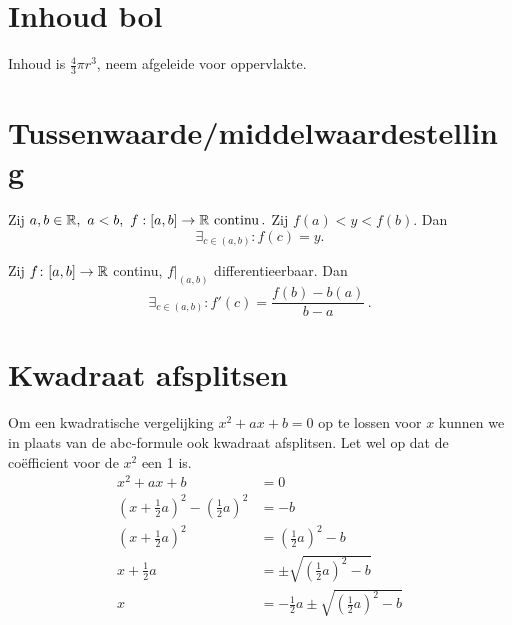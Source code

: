 \documentclass{article}
\begin{document}
	\section{Inhoud bol}\label{sec:inhoudBol}
		Inhoud is $\frac{4}{3} \pi r^3$, neem afgeleide voor oppervlakte.

    \section{Tussenwaarde/middelwaardestelling}\label{sec:tussenwaarde/middelwaardestelling}
    \begin{stelling}

        Zij $a,b \in \mathbb{R},\ a<b,\
            f:[a,b]\to \mathbb{R} \text{ continu}\,.
        $
        Zij $f(a)<y<f(b)$.
        Dan \[ \exists_{c\in(a,b)}:f(c)=y. \]
    \end{stelling}

    \begin{stelling}

        Zij $f\colon[a,b] \to \mathbb{R}$ continu, $f|_{(a,b)}$ differentieerbaar.
        Dan
        \[
        \exists_{c \in (a,b)} : f'(c) = \frac{f(b)-b(a)}{b-a}\,.
        \]
    \end{stelling}
		
	\section{Kwadraat afsplitsen}\label{sec:kwadraatAfsplitsen}
        Om een kwadratische vergelijking $x^2 + ax + b = 0$ op te lossen voor $x$ kunnen we in plaats van de abc-formule ook kwadraat afsplitsen.
        Let wel op dat de co\"efficient voor de $x^2$ een 1 is.
        \begin{align*}
            x^2 + a x + b &= 0 \\
            \left(x + \frac{1}{2} a\right)^2 - \left( \frac{1}{2}a \right)^2 &= - b \\
            \left(x + \frac{1}{2} a\right)^2 &= \left( \frac{1}{2}a \right)^2 - b \\
            x + \frac{1}{2} a &= \pm \sqrt{\left( \frac{1}{2}a \right)^2 - b} \\
            x &= -  \frac{1}{2} a \pm \sqrt{\left(\frac{1}{2}a \right)^2 - b}
        \end{align*}

    \newpage
\end{document}
